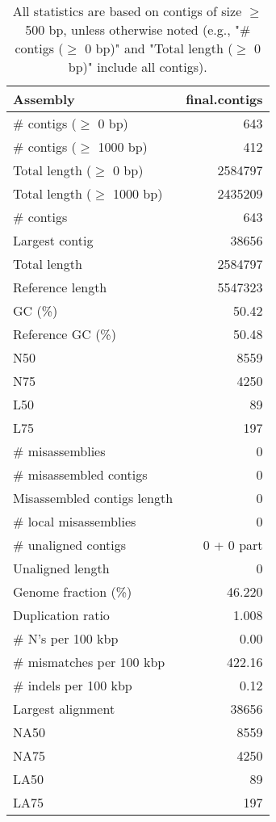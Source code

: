 \documentclass[12pt,a4paper]{article}
\begin{document}
\begin{table}[ht]
\begin{center}
\caption{All statistics are based on contigs of size $\geq$ 500 bp, unless otherwise noted (e.g., "\# contigs ($\geq$ 0 bp)" and "Total length ($\geq$ 0 bp)" include all contigs).}
\begin{tabular}{|l*{1}{|r}|}
\hline
Assembly & final.contigs \\ \hline
\# contigs ($\geq$ 0 bp) & 643 \\ \hline
\# contigs ($\geq$ 1000 bp) & 412 \\ \hline
Total length ($\geq$ 0 bp) & 2584797 \\ \hline
Total length ($\geq$ 1000 bp) & 2435209 \\ \hline
\# contigs & 643 \\ \hline
Largest contig & 38656 \\ \hline
Total length & 2584797 \\ \hline
Reference length & 5547323 \\ \hline
GC (\%) & 50.42 \\ \hline
Reference GC (\%) & 50.48 \\ \hline
N50 & 8559 \\ \hline
N75 & 4250 \\ \hline
L50 & 89 \\ \hline
L75 & 197 \\ \hline
\# misassemblies & 0 \\ \hline
\# misassembled contigs & 0 \\ \hline
Misassembled contigs length & 0 \\ \hline
\# local misassemblies & 0 \\ \hline
\# unaligned contigs & 0 + 0 part \\ \hline
Unaligned length & 0 \\ \hline
Genome fraction (\%) & 46.220 \\ \hline
Duplication ratio & 1.008 \\ \hline
\# N's per 100 kbp & 0.00 \\ \hline
\# mismatches per 100 kbp & 422.16 \\ \hline
\# indels per 100 kbp & 0.12 \\ \hline
Largest alignment & 38656 \\ \hline
NA50 & 8559 \\ \hline
NA75 & 4250 \\ \hline
LA50 & 89 \\ \hline
LA75 & 197 \\ \hline
\end{tabular}
\end{center}
\end{table}
\end{document}
